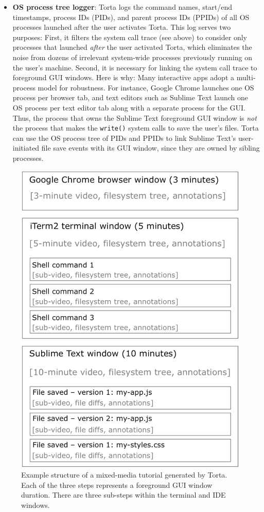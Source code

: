 \begin{itemize}
\item \textbf{OS process tree logger}: Torta logs the command names,
start/end timestamps, process IDs (PIDs), and parent process IDs (PPIDs)
of all OS processes launched after the user activates Torta. This log
serves two purposes: First, it filters the system call trace (see above)
to consider only processes that launched \emph{after} the user activated Torta,
which eliminates the noise from dozens of irrelevant system-wide
processes previously running on the user's machine. Second, it is
necessary for linking the system call trace to foreground GUI windows.
Here is why: Many interactive apps adopt a multi-process model for
robustness. For instance, Google Chrome launches one OS process per
browser tab, and text editors such as Sublime Text launch one OS process
per text editor tab along with a separate process for the GUI. Thus, the
process that owns the Sublime Text foreground GUI window is \emph{not}
the process that makes the {\small \texttt{write()}} system calls to
save the user's files. Torta can use the OS process tree of
PIDs and PPIDs to link Sublime Text's user-initiated file save events with its GUI
window, since they are owned by sibling processes.

\end{itemize}


\begin{figure}[h!]

\centering
\includegraphics[width=0.5\columnwidth]{figures/torta/torta-schematic.png}

\caption{Example structure of a mixed-media tutorial generated by
Torta. Each of the three steps represents a foreground GUI window duration. There are
three sub-steps within the terminal and IDE windows.}

\label{fig:torta-schematic}
\vspace{-1em} %
\end{figure}


